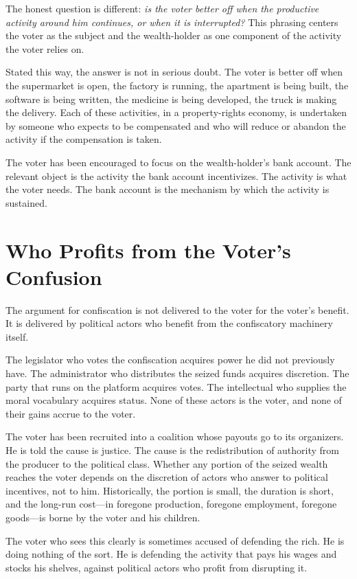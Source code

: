 \documentclass[11pt]{article}
\begin{document}
The honest question is different: \emph{is the voter better off when the productive activity around him continues, or when it is interrupted?} This phrasing centers the voter as the subject and the wealth-holder as one component of the activity the voter relies on.

Stated this way, the answer is not in serious doubt. The voter is better off when the supermarket is open, the factory is running, the apartment is being built, the software is being written, the medicine is being developed, the truck is making the delivery. Each of these activities, in a property-rights economy, is undertaken by someone who expects to be compensated and who will reduce or abandon the activity if the compensation is taken.

The voter has been encouraged to focus on the wealth-holder's bank account. The relevant object is the activity the bank account incentivizes. The activity is what the voter needs. The bank account is the mechanism by which the activity is sustained.

\section{Who Profits from the Voter's Confusion}

The argument for confiscation is not delivered to the voter for the voter's benefit. It is delivered by political actors who benefit from the confiscatory machinery itself.

The legislator who votes the confiscation acquires power he did not previously have. The administrator who distributes the seized funds acquires discretion. The party that runs on the platform acquires votes. The intellectual who supplies the moral vocabulary acquires status. None of these actors is the voter, and none of their gains accrue to the voter.

The voter has been recruited into a coalition whose payouts go to its organizers. He is told the cause is justice. The cause is the redistribution of authority from the producer to the political class. Whether any portion of the seized wealth reaches the voter depends on the discretion of actors who answer to political incentives, not to him. Historically, the portion is small, the duration is short, and the long-run cost---in foregone production, foregone employment, foregone goods---is borne by the voter and his children.

The voter who sees this clearly is sometimes accused of defending the rich. He is doing nothing of the sort. He is defending the activity that pays his wages and stocks his shelves, against political actors who profit from disrupting it.
\end{document}
